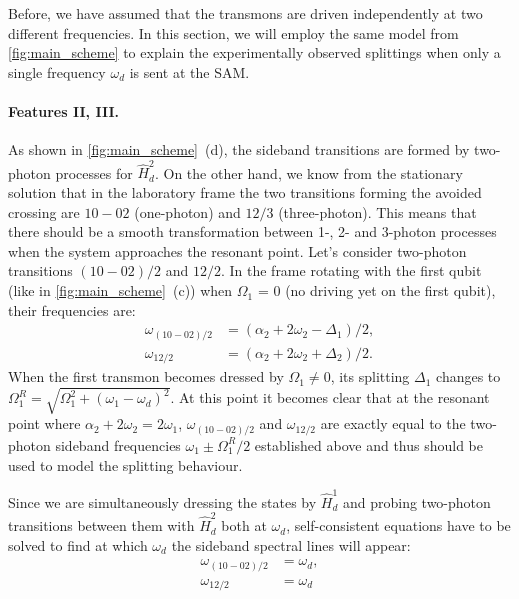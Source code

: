 \documentclass[%
 aip,
 amsmath,amssymb,
 reprint,%
]{revtex4-1}
\begin{document}
Before, we have assumed that the transmons are driven independently at two different frequencies. In this section, we will employ the same model from \autoref{fig:main_scheme} to explain the experimentally observed splittings when only a single frequency $\omega_d$ is sent at the SAM. 

\paragraph{Features II, III.}As shown in \autoref{fig:main_scheme}~(d), the sideband transitions are formed by two-photon processes for $\hat H_d^2$. On the other hand, we know from the stationary solution that in the laboratory frame the two transitions forming the avoided crossing are $10 - 02$ (one-photon) and $12/3$ (three-photon). This means that there should be a smooth transformation between 1-, 2- and 3-photon processes when the system approaches the resonant point. Let's consider two-photon transitions $(10 - 02)/2$ and $12/2$. In the frame rotating with the first qubit (like in \autoref{fig:main_scheme}~(c)) when $\Omega_1$ = 0 (no driving yet on the first qubit), their frequencies are:
\begin{equation}
\begin{aligned}
\omega_{(10-02)/2} &= (\alpha_2 + 2 \omega_{2} - \Delta_1)/2,\\
 \omega_{12/2} &= (\alpha_2 + 2 \omega_{2} + \Delta_2)/2.
\end{aligned}
\end{equation}
When the first transmon becomes dressed by $\Omega_1 \neq 0$, its splitting $\Delta_1$ changes to $\Omega^R_1 =\sqrt{\Omega_{1}^2 + \left(\omega_{1} - \omega_{d}\right)^{2}}$. At this point it becomes clear that at the resonant point where $\alpha_2 + 2 \omega_{2} = 2\omega_1$, $\omega_{(10-02)/2}$ and $\omega_{12/2}$ are exactly equal to the two-photon sideband frequencies $\omega_1 \pm \Omega_1^R/2$ established above and thus should be used to model the splitting behaviour.

Since we are simultaneously dressing the states by $\hat H_d^1$ and probing two-photon transitions between them with $\hat H_d^2$ both at $\omega_d$, self-consistent equations have to be solved to find at which $\omega_d$ the sideband spectral lines will appear:
\begin{equation}
\begin{aligned}
\omega_{(10-02)/2} &= \omega_d,\\
\omega_{12/2} &= \omega_d
\end{aligned}
\end{equation}
\end{document}

